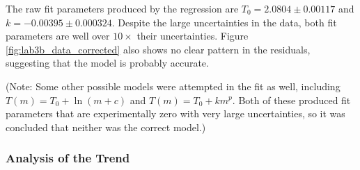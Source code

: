 \documentclass[aps,twocolumn,secnumarabic,nobalancelastpage,amsmath,amssymb,nofootinbib,floatfix,letterpaper]{revtex4}
\begin{document}
The raw fit parameters produced by the regression are \(T_0 = 2.0804 \pm 0.00117\) and \(k = -0.00395 \pm 0.000324\).
Despite the large uncertainties in the data, both fit parameters are well over \(10\times\) their uncertainties. Figure
\ref{fig:lab3b_data_corrected} also shows no clear pattern in the residuals, suggesting that the model is probably
accurate.

(Note: Some other possible models were attempted in the fit as well, including \(T(m) = T_0 + \ln(m + c)\) and
\(T(m) = T_0 + km^p\). Both of these produced fit parameters that are experimentally zero with very large uncertainties,
so it was concluded that neither was the correct model.)

\subsubsection{Analysis of the Trend}
\end{document}
